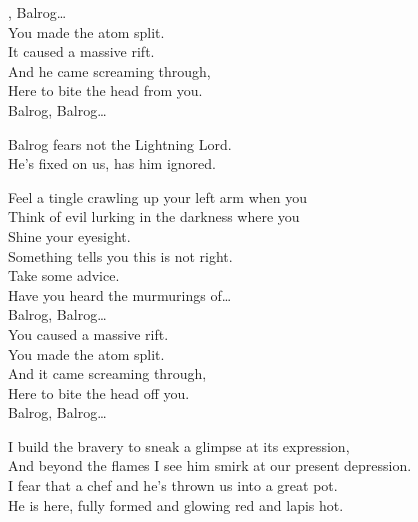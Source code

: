 



, Balrog… \\

You made the atom split. \\
It caused a massive rift. \\
And he came screaming through, \\
Here to bite the head from you. \\

Balrog, Balrog… \\


Balrog fears not the Lightning Lord. \\
He's fixed on us, has him ignored. \\


Feel a tingle crawling up your left arm when you \\
Think of evil lurking in the darkness where you \\
Shine your eyesight. \\
Something tells you this is not right. \\
Take some advice. \\
Have you heard the murmurings of… \\

Balrog, Balrog… \\

You caused a massive rift. \\
You made the atom split. \\
And it came screaming through, \\
Here to bite the head off you. \\

Balrog, Balrog… \\


I build the bravery to sneak a glimpse at its expression, \\
And beyond the flames I see him smirk at our present depression. \\

I fear that  a chef and he's thrown us into a great pot. \\
He is here, fully formed and glowing red and lapis hot. \\

